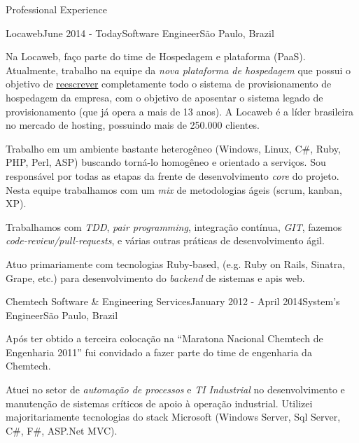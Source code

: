 \documentclass{resume} %
\begin{document}
\begin{rSection}{Professional Experience}
  \begin{rSubsection}{Locaweb}{June 2014 - Today}{Software Engineer}{São
      Paulo, Brazil}

  \item Na Locaweb, faço parte do time de Hospedagem e plataforma (PaaS).
    Atualmente, trabalho na equipe da {\em nova plataforma de hospedagem} que
    possui o objetivo de \underline{reescrever} completamente todo o sistema de
    provisionamento de hospedagem da empresa, com o objetivo de aposentar o
    sistema legado de provisionamento (que já opera a mais de 13 anos). A
    Locaweb é a líder brasileira no mercado de hosting, possuindo mais de
    250.000 clientes.

  \item Trabalho em um ambiente bastante heterogêneo (Windows, Linux, C\#, Ruby,
    PHP, Perl, ASP) buscando torná-lo homogêneo e orientado a serviços. Sou
    responsável por todas as etapas da frente de desenvolvimento {\em core} do
    projeto. Nesta equipe trabalhamos com um {\em mix} de metodologias ágeis
    (scrum, kanban, XP).

  \item Trabalhamos com {\em TDD}, {\em pair programming}, integração contínua,
    {\em GIT}, fazemos {\em code-review/pull-requests}, e várias outras práticas
    de desenvolvimento ágil.

  \item Atuo primariamente com tecnologias Ruby-based, (e.g. Ruby on Rails,
    Sinatra, Grape, etc.) para desenvolvimento do {\em backend} de sistemas e
    apis web.
  \end{rSubsection}

  \begin{rSubsection}{Chemtech Software \& Engineering Services}{January 2012 -
      April 2014}{System's Engineer}{São Paulo, Brazil}

  \item Após ter obtido a terceira colocação na ``Maratona Nacional Chemtech de
    Engenharia 2011'' fui convidado a fazer parte do time de engenharia da
    Chemtech.

  \item Atuei no setor de {\em automação de processos} e {\em TI Industrial} no
    desenvolvimento e manutenção de sistemas críticos de apoio à operação
    industrial. Utilizei majoritariamente tecnologias do stack Microsoft
    (Windows Server, Sql Server, C\#, F\#, ASP.Net MVC).


\end{rSubsection}
\end{rSection}
\end{document}
